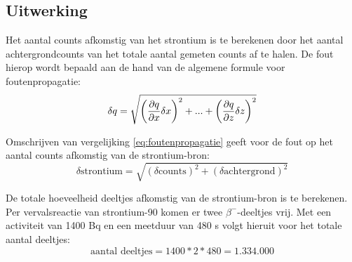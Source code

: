 \documentclass[11pt,a4paper]{article}
\begin{document}
\begin{table}
\caption{Meetdata van de ijkmetingen. De fouten op de aantallen counts worden gegeven door de wortel van het aantal counts zelf.}
\centering
{}
\label{tab:tabel1}
\end{table}

\subsection{Uitwerking}
Het aantal counts afkomstig van het strontium is te berekenen door het aantal achtergrondcounts van het totale aantal gemeten counts af te halen. De fout hierop wordt bepaald aan de hand van de algemene formule voor foutenpropagatie:
\begin{equation}
\delta q = \sqrt{\left(\pdv{q}{x}\delta x\right)^2 + ... + \left(\pdv{q}{z}\delta z\right)^2}
\label{eq:foutenpropagatie}
\end{equation}

Omschrijven van vergelijking \ref{eq:foutenpropagatie} geeft voor de fout op het aantal counts afkomstig van de strontium-bron:
\begin{equation}
\delta \text{strontium} = \sqrt{\left(\delta \text{counts}\right)^2 + \left(\delta \text{achtergrond}\right)^2}
\label{eq:fout_strontium}
\end{equation}

De totale hoeveelheid deeltjes afkomstig van de strontium-bron is te berekenen. Per vervalsreactie van strontium-90 komen er twee $\beta^-$-deeltjes vrij. Met een activiteit van 1400 Bq en een meetduur van 480 s volgt hieruit voor het totale aantal deeltjes:
\begin{equation}
\text{aantal deeltjes} = 1400 * 2 * 480 = 1.334.000
\label{eq:aantal_deeltjes_ijkbron}
\end{equation}
\end{document}
